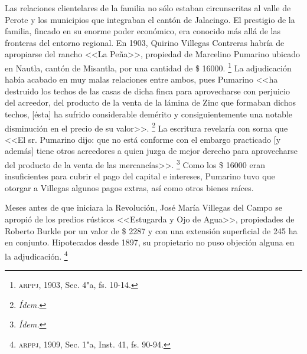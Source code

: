 \documentclass[14pt,twoside,final]{extbook} %
\let\oldfootnote\footnote
\renewcommand\footnote[1]{%
\oldfootnote{\hspace{1mm}#1}}
\begin{document}
Las relaciones clientelares de la familia no sólo estaban circunscritas al valle de Perote y los municipios que integraban el cantón de Jalacingo. El prestigio de la familia, fincado en su enorme poder económico, era conocido más allá de las fronteras del entorno regional. En 1903, Quirino Villegas Contreras habría de apropiarse del rancho <<La Peña>>, propiedad de Marcelino Pumarino ubicado en Nautla, cantón de Misantla, por una cantidad de \$ 16000.\footnote{\textsc{arppj}, 1903, Sec. 4"a, fs. 10-14.} La adjudicación había acabado en muy malas relaciones entre ambos, pues Pumarino <<ha destruido los techos de las casas de dicha finca para aprovecharse con perjuicio del acreedor, del producto de la venta de la lámina de Zinc que formaban dichos techos, [ésta] ha sufrido considerable demérito y consiguientemente una notable disminución en el precio de su valor>>.\footnote{\em Ídem.} La escritura revelaría con sorna que <<El sr. Pumarino dijo: que no está conforme con el embargo practicado [y además] tiene otros acreedores a quien juzga de mejor derecho
para aprovecharse del producto de la venta de las mercancías>>.\footnote{\em Ídem.} Como los \$ 16000 eran insuficientes para cubrir el pago del capital e intereses, Pumarino tuvo que otorgar a Villegas algunos pagos extras, así como otros bienes raíces.

Meses antes de que iniciara la Revolución, José María Villegas del Campo se apropió de los predios rústicos <<Estugarda y Ojo de Agua>>, propiedades de Roberto Burkle por un valor de \$ 2287 y con una extensión superficial de 245 ha en conjunto. Hipotecados desde 1897, su propietario no puso objeción alguna en la adjudicación.\footnote{\textsc{arppj}, 1909, Sec. 1"a, Inst. 41, fs. 90-94.}
\end{document}
